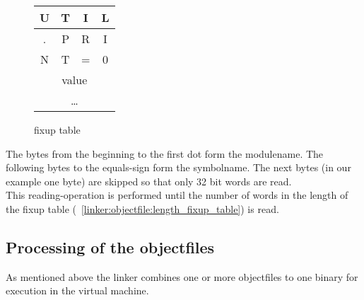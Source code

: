 \begin{figure}[h]
		
	\begin{center}
		\begin{tabular}{|c|c|c|c|}
			\hline
			U & T & I & L \\
			\hline
			. & P & R & I \\
			\hline
			N & T & = & 0 \\
			\hline 
			\multicolumn{4}{|c|}{value} \\
			\hline
			\multicolumn{4}{|c|}{\ldots} \\
			\hline
		\end{tabular}
	\end{center}
	
	\caption{fixup table}
	\label{linker:objectfile:example:fixup_table}
\end{figure}
The bytes from the beginning to the first dot form the modulename. The following
bytes to the equals-sign form the symbolname. The next bytes (in our example one
byte) are skipped so that only 32 bit words are read. \\
This reading-operation is performed until the number of words in the length of
the fixup table (~\ref{linker:objectfile:length_fixup_table}) is read.

\subsection{Processing of the objectfiles}
\label{linker:objectfile_procession}
As mentioned above the linker combines one or more objectfiles to one binary for
execution in the virtual machine.\\ 

